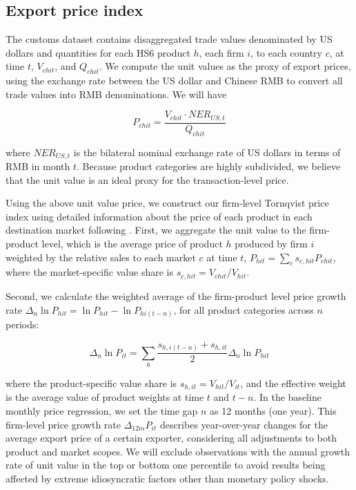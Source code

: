 \subsection{Export price index}

The customs dataset contains disaggregated trade values denominated by US dollars and quantities for each HS6 product $h$, each firm $i$, to each country $c$, at time $t$, $V_{chit}$, and $Q_{chit}$. We compute the unit values as the proxy of export prices, using the exchange rate between the US dollar and Chinese RMB to convert all trade values into RMB denominations. We will have

$$
P_{chit}=\frac{V_{chit}\cdot NER_{US,t}}{Q_{chit}}
$$

\noindent where $NER_{US,t}$ is the bilateral nominal exchange rate of US dollars in terms of RMB in month $t$. Because product categories are highly subdivided, we believe that the unit value is an ideal proxy for the transaction-level price. 

Using the above unit value price, we construct our firm-level Tornqvist price index using detailed information about the price of each product in each destination market following \cite{smeets2013estimating}. First, we aggregate the unit value to the firm-product level, which is the average price of product $h$ produced by firm $i$ weighted by the relative sales to each market $c$ at time $t$, $P_{hit}=\sum_c s_{c,hit} P_{chit}$, where the market-specific value share is $s_{c,hit}=V_{chit}/V_{hit}$. 

Second, we calculate the weighted average of the firm-product level price growth rate $\Delta_n \ln P_{hit} = \ln P_{hit}- \ln P_{hi(t-n)}$, for all product categories across $n$ periods: 

$$
\Delta_n \ln P_{it} = \sum _{h} \frac{s_{h,i(t-n)}+s_{h,it}}{2} \Delta_n \ln P_{hit}
$$

\noindent where the product-specific value share is $s_{h,it}=V_{hit}/V_{it}$, and the effective weight is the average value of product weights at time $t$ and $t-n$. In the baseline monthly price regression, we set the time gap $n$ as 12 months (one year). This firm-level price growth rate $\Delta_{12m} P_{it}$ describes year-over-year changes for the average export price of a certain exporter, considering all adjustments to both product and market scopes. We will exclude observations with the annual growth rate of unit value in the top or bottom one percentile to avoid results being affected by extreme idiosyncratic factors other than monetary policy shocks.

